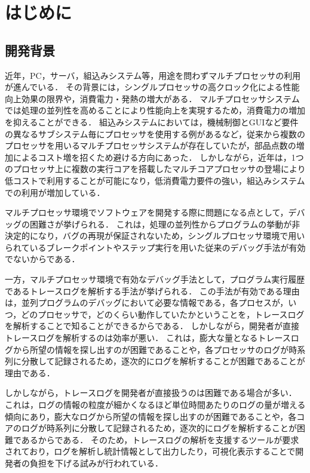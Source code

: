 \chapter{はじめに}

\section{開発背景}

近年，PC，サーバ，組込みシステム等，用途を問わずマルチプロセッサの利用が進んでいる．
その背景には，シングルプロセッサの高クロック化による性能向上効果の限界や，消費電力・発熱の増大がある．
マルチプロセッサシステムでは処理の並列性を高めることにより性能向上を実現するため，消費電力の増加を抑えることができる．
組込みシステムにおいては，機械制御とGUIなど要件の異なるサブシステム毎にプロセッサを使用する例があるなど，従来から複数のプロセッサを用いるマルチプロセッサシステムが存在していたが，部品点数の増加によるコスト増を招くため避ける方向にあった．
しかしながら，近年は，1つのプロセッサ上に複数の実行コアを搭載したマルチコアプロセッサの登場により低コストで利用することが可能になり，低消費電力要件の強い，組込みシステムでの利用が増加している．

マルチプロセッサ環境でソフトウェアを開発する際に問題になる点として，デバッグの困難さが挙げられる．
これは，処理の並列性からプログラムの挙動が非決定的になり，バグの再現が保証されないため，シングルプロセッサ環境で用いられているブレークポイントやステップ実行を用いた従来のデバッグ手法が有効でないからである．

一方，マルチプロセッサ環境で有効なデバッグ手法として，プログラム実行履歴であるトレースログを解析する手法が挙げられる．
この手法が有効である理由は，並列プログラムのデバッグにおいて必要な情報である，各プロセスが，いつ，どのプロセッサで，どのくらい動作していたかということを，トレースログを解析することで知ることができるからである．
しかしながら，開発者が直接トレースログを解析するのは効率が悪い．
これは，膨大な量となるトレースログから所望の情報を探し出すのが困難であることや，各プロセッサのログが時系列に分散して記録されるため，逐次的にログを解析することが困難であることが理由である．

しかしながら，トレースログを開発者が直接扱うのは困難である場合が多い．
これは，ログの情報の粒度が細かくなるほど単位時間あたりのログの量が増える傾向にあり，膨大なログから所望の情報を探し出すのが困難であることや，各コアのログが時系列に分散して記録されるため，逐次的にログを解析することが困難であるからである．
そのため，トレースログの解析を支援するツールが要求されており，ログを解析し統計情報として出力したり，可視化表示することで開発者の負担を下げる試みが行われている．

